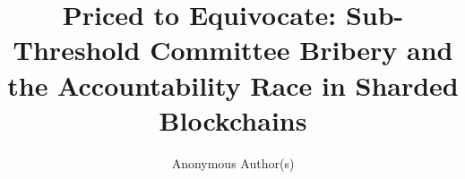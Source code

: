 \documentclass[sigconf,nonacm,review,anonymous]{acmart}
\theoremstyle{acmplain}
\newcommand{\paperkeywords}[1]{\keywords{#1}}
\begin{document}
\title{Priced to Equivocate: Sub-Threshold Committee Bribery and the Accountability Race in Sharded Blockchains}

\author{Anonymous Author(s)}



\maketitle




















\end{document}
